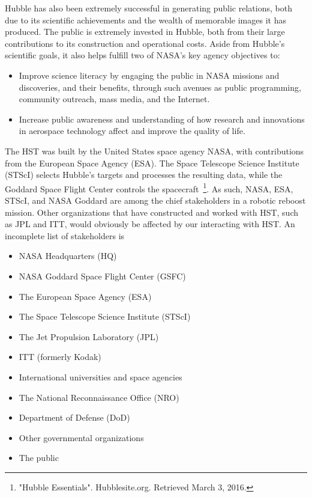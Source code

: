 \documentclass[onecolumn,10pt]{jhwhw}
\begin{document}
Hubble has also been extremely successful in generating public relations, both due to its scientific achievements and the wealth of memorable images it has produced. The public is extremely invested in Hubble, both from their large contributions to its construction and operational costs. Aside from Hubble's scientific goals, it also helps fulfill two of NASA's key agency objectives to:
\begin{itemize}
\setlength\itemsep{0em}
\item Improve science literacy by engaging the public in NASA missions and discoveries, and their benefits, through such avenues as public programming, community outreach, mass media, and the Internet.
\item Increase public awareness and understanding of how research and innovations in aerospace technology affect and improve the quality of life.
\end{itemize}

The HST was built by the United States space agency NASA, with contributions from the European Space Agency (ESA). The Space Telescope Science Institute (STScI) selects Hubble's targets and processes the resulting data, while the Goddard Space Flight Center controls the spacecraft~\footnote{"Hubble Essentials". Hubblesite.org. Retrieved March 3, 2016.}. As such, NASA, ESA, STScI, and NASA Goddard are among the chief stakeholders in a robotic reboost mission. Other organizations that have constructed and worked with HST, such as JPL and ITT, would obviously be affected by our interacting with HST. An incomplete list of stakeholders is
\begin{itemize}
\setlength\itemsep{0em}
\item NASA Headquarters (HQ)
\item NASA Goddard Space Flight Center (GSFC)
\item The European Space Agency (ESA)
\item The Space Telescope Science Institute (STScI)
\item The Jet Propulsion Laboratory (JPL)
\item ITT (formerly Kodak)
\item International universities and space agencies
\item The National Reconnaissance Office (NRO)
\item Department of Defense (DoD)
\item Other governmental organizations
\item The public
\end{itemize}
\end{document}
